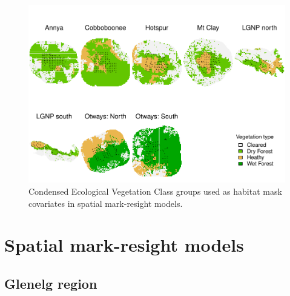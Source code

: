 \documentclass[11pt,a4paper,titlepage,twoside,openright]{style/unimelbthesis}
\begin{document}
\begin{mainmatter}
\newpage

\(~\)

\(~\)

\(~\)
\begin{figure}

{\centering \includegraphics[width=1\linewidth]{figure/density-veg-1} 

}

\caption{Condensed Ecological Vegetation Class groups used as habitat mask covariates in spatial mark-resight models.}\label{fig:density-veg}
\end{figure}
\newpage

\hypertarget{spatial-mark-resight-models}{%
\section{Spatial mark-resight models}\label{spatial-mark-resight-models}}

\hypertarget{glenelg-region-4}{%
\subsection{Glenelg region}\label{glenelg-region-4}}

\(~\)

\(~\)

\(~\)


\end{mainmatter}
\end{document}
